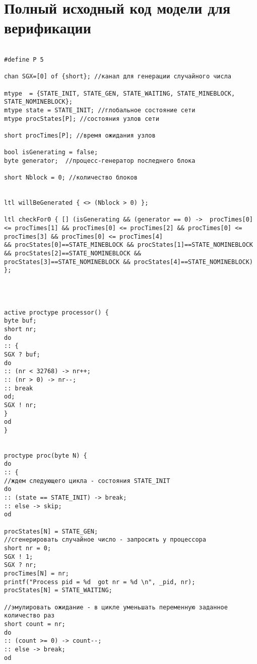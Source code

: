 \section{Полный исходный код модели для верификации}\label{app:B3}
\begin{lstlisting}[language=Promela]

#define P 5

chan SGX=[0] of {short}; //канал для генерации случайного числа

mtype  = {STATE_INIT, STATE_GEN, STATE_WAITING, STATE_MINEBLOCK, STATE_NOMINEBLOCK};
mtype state = STATE_INIT; //глобальное состояние сети
mtype procStates[P]; //состояния узлов сети

short procTimes[P]; //время ожидания узлов

bool isGenerating = false;
byte generator;  //процесс-генератор последнего блока

short Nblock = 0; //количество блоков


ltl willBeGenerated { <> (Nblock > 0) };

ltl checkFor0 { [] (isGenerating && (generator == 0) ->  procTimes[0] <= procTimes[1] && procTimes[0] <= procTimes[2] && procTimes[0] <= procTimes[3] && procTimes[0] <= procTimes[4] 
&& procStates[0]==STATE_MINEBLOCK && procStates[1]==STATE_NOMINEBLOCK && procStates[2]==STATE_NOMINEBLOCK && procStates[3]==STATE_NOMINEBLOCK && procStates[4]==STATE_NOMINEBLOCK)
};




active proctype processor() {  
byte buf;
short nr;	
do
:: {
SGX ? buf;
do
:: (nr < 32768) -> nr++;
:: (nr > 0) -> nr--;		
:: break
od;
SGX ! nr;
}
od
}


proctype proc(byte N) {
do
:: {
//ждем следующего цикла - состояния STATE_INIT
do  
:: (state == STATE_INIT) -> break;
:: else -> skip;
od

procStates[N] = STATE_GEN;
//сгенерировать случайное число - запросить у процессора 
short nr = 0;
SGX ! 1;
SGX ? nr;
procTimes[N] = nr;
printf("Process pid = %d  got nr = %d \n", _pid, nr);
procStates[N] = STATE_WAITING;

//эмулировать ожидание - в цикле уменьшать переменную заданное количество раз
short count = nr;
do 
:: (count >= 0) -> count--; 
:: else -> break;
od


\end{lstlisting}

